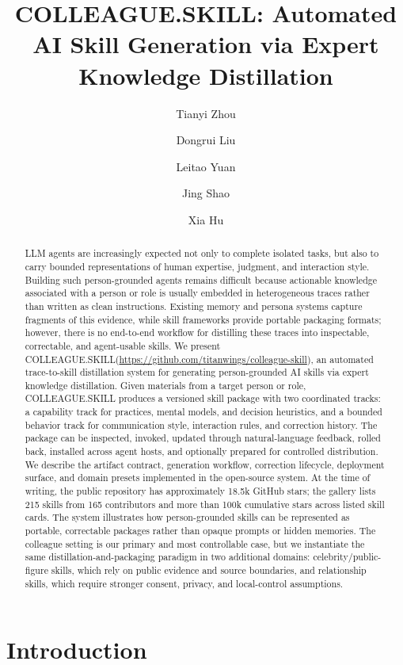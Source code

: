 \documentclass{llmxive}
\title{COLLEAGUE.SKILL: Automated AI Skill Generation via Expert Knowledge Distillation}
\author{Tianyi Zhou \and Dongrui Liu \and Leitao Yuan \and Jing Shao \and Xia Hu}
\providecommand{\system}{\textsc{COLLEAGUE.SKILL}\xspace}
\begin{document}
\maketitle
\begin{abstract}
LLM agents are increasingly expected not only to complete isolated tasks, but also to carry bounded representations of human expertise, judgment, and interaction style. Building such person-grounded agents remains difficult because actionable knowledge associated with a person or role is usually embedded in heterogeneous traces rather than written as clean instructions. Existing memory and persona systems capture fragments of this evidence, while skill frameworks provide portable packaging formats; however, there is no end-to-end workflow for distilling these traces into inspectable, correctable, and agent-usable skills. We present \system (\url{https://github.com/titanwings/colleague-skill}), an automated trace-to-skill distillation system for generating person-grounded AI skills via expert knowledge distillation. Given materials from a target person or role, \system produces a versioned skill package with two coordinated tracks: a capability track for practices, mental models, and decision heuristics, and a bounded behavior track for communication style, interaction rules, and correction history. The package can be inspected, invoked, updated through natural-language feedback, rolled back, installed across agent hosts, and optionally prepared for controlled distribution. We describe the artifact contract, generation workflow, correction lifecycle, deployment surface, and domain presets implemented in the open-source system. At the time of writing, the public repository has approximately 18.5k GitHub stars; the gallery lists 215 skills from 165 contributors and more than 100k cumulative stars across listed skill cards. The system illustrates how person-grounded skills can be represented as portable, correctable packages rather than opaque prompts or hidden memories. The colleague setting is our primary and most controllable case, but we instantiate the same distillation-and-packaging paradigm in two additional domains: celebrity/public-figure skills, which rely on public evidence and source boundaries, and relationship skills, which require stronger consent, privacy, and local-control assumptions.
\end{abstract}
\section{Introduction}
\end{document}
